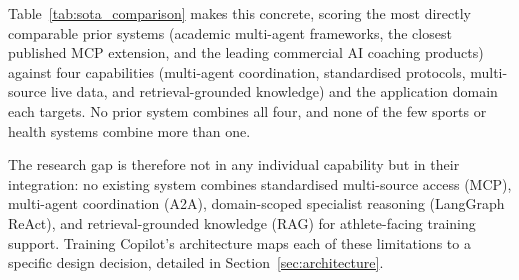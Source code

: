 Table~\ref{tab:sota_comparison} makes this concrete, scoring the most directly comparable prior systems (academic multi-agent frameworks, the closest published MCP extension, and the leading commercial AI coaching products) against four capabilities (multi-agent coordination, standardised protocols, multi-source live data, and retrieval-grounded knowledge) and the application domain each targets. No prior system combines all four, and none of the few sports or health systems combine more than one.



The research gap is therefore not in any individual capability but in their integration: no existing system combines standardised multi-source access (MCP), multi-agent coordination (A2A), domain-scoped specialist reasoning (LangGraph ReAct), and retrieval-grounded knowledge (RAG) for athlete-facing training support. Training Copilot's architecture maps each of these limitations to a specific design decision, detailed in Section~\ref{sec:architecture}.
